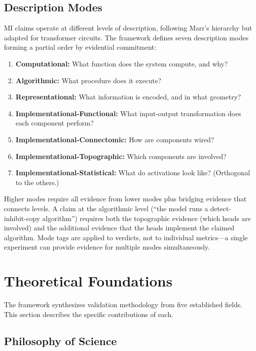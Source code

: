 \documentclass[10pt]{article}
\begin{document}
\subsection{Description Modes}
\label{sec:description-modes}

MI claims operate at different levels of description, following Marr's hierarchy but adapted for transformer circuits. The framework defines seven description modes forming a partial order by evidential commitment:

\begin{enumerate}[nosep]
    \item \textbf{Computational:} What function does the system compute, and why?
    \item \textbf{Algorithmic:} What procedure does it execute?
    \item \textbf{Representational:} What information is encoded, and in what geometry?
    \item \textbf{Implementational-Functional:} What input-output transformation does each component perform?
    \item \textbf{Implementational-Connectomic:} How are components wired?
    \item \textbf{Implementational-Topographic:} Which components are involved?
    \item \textbf{Implementational-Statistical:} What do activations look like? (Orthogonal to the others.)
\end{enumerate}

Higher modes require all evidence from lower modes plus bridging evidence that connects levels. A claim at the algorithmic level (``the model runs a detect-inhibit-copy algorithm'') requires both the topographic evidence (which heads are involved) and the additional evidence that the heads implement the claimed algorithm. Mode tags are applied to verdicts, not to individual metrics---a single experiment can provide evidence for multiple modes simultaneously.

\section{Theoretical Foundations}
\label{sec:foundations}

The framework synthesizes validation methodology from five established fields. This section describes the specific contributions of each.

\subsection{Philosophy of Science}
\label{sec:phil-sci}
\end{document}
